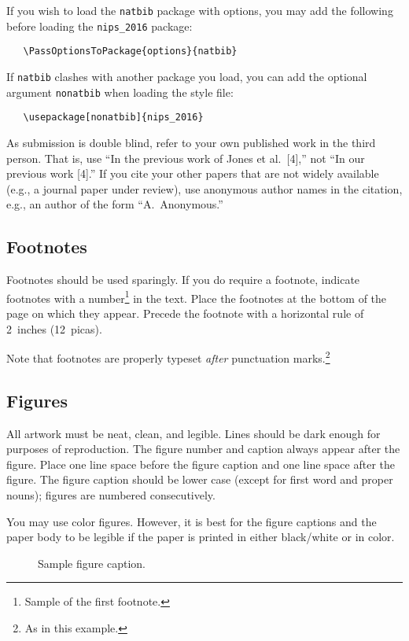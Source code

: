\documentclass{article}
\begin{document}
If you wish to load the \verb+natbib+ package with options, you may
add the following before loading the \verb+nips_2016+ package:
\begin{verbatim}
   \PassOptionsToPackage{options}{natbib}
\end{verbatim}

If \verb+natbib+ clashes with another package you load, you can add
the optional argument \verb+nonatbib+ when loading the style file:
\begin{verbatim}
   \usepackage[nonatbib]{nips_2016}
\end{verbatim}

As submission is double blind, refer to your own published work in the
third person. That is, use ``In the previous work of Jones et
al.\ [4],'' not ``In our previous work [4].'' If you cite your other
papers that are not widely available (e.g., a journal paper under
review), use anonymous author names in the citation, e.g., an author
of the form ``A.\ Anonymous.''

\subsection{Footnotes}

Footnotes should be used sparingly.  If you do require a footnote,
indicate footnotes with a number\footnote{Sample of the first
  footnote.} in the text. Place the footnotes at the bottom of the
page on which they appear.  Precede the footnote with a horizontal
rule of 2~inches (12~picas).

Note that footnotes are properly typeset \emph{after} punctuation
marks.\footnote{As in this example.}

\subsection{Figures}

All artwork must be neat, clean, and legible. Lines should be dark
enough for purposes of reproduction. The figure number and caption
always appear after the figure. Place one line space before the figure
caption and one line space after the figure. The figure caption should
be lower case (except for first word and proper nouns); figures are
numbered consecutively.

You may use color figures.  However, it is best for the figure
captions and the paper body to be legible if the paper is printed in
either black/white or in color.
\begin{figure}[h]
  \centering
  \fbox{\rule[-.5cm]{0cm}{4cm} \rule[-.5cm]{4cm}{0cm}}
  \caption{Sample figure caption.}
\end{figure}
\end{document}
